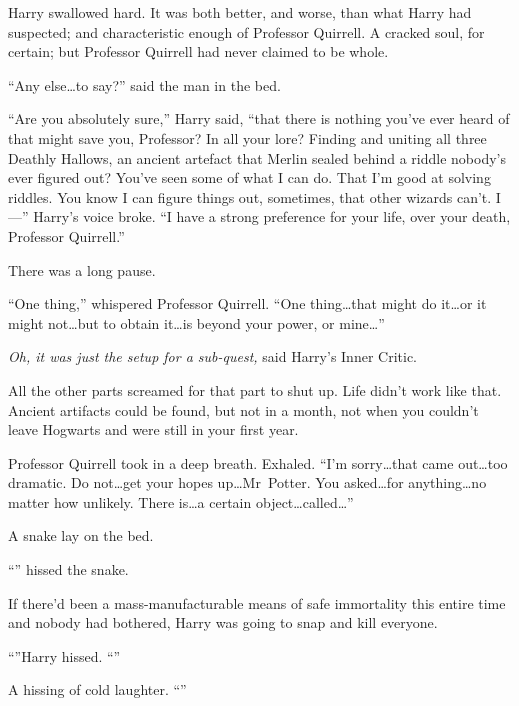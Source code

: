 Harry swallowed hard. It was both better, and worse, than what Harry had suspected; and characteristic enough of Professor Quirrell. A cracked soul, for certain; but Professor Quirrell had never claimed to be whole.

“Any else…to say?” said the man in the bed.

“Are you absolutely sure,” Harry said, “that there is nothing you’ve ever heard of that might save you, Professor? In all your lore? Finding and uniting all three Deathly Hallows, an ancient artefact that Merlin sealed behind a riddle nobody’s ever figured out? You’ve seen some of what I can do. That I’m good at solving riddles. You know I can figure things out, sometimes, that other wizards can’t. I—” Harry’s voice broke. “I have a strong preference for your life, over your death, Professor Quirrell.”

There was a long pause.

“One thing,” whispered Professor Quirrell. “One thing…that might do it…or it might not…but to obtain it…is beyond your power, or mine…”

\emph{Oh, it was just the setup for a sub-quest,} said Harry’s Inner Critic.

All the other parts screamed for that part to shut up. Life didn’t work like that. Ancient artifacts could be found, but not in a month, not when you couldn’t leave Hogwarts and were still in your first year.

Professor Quirrell took in a deep breath. Exhaled. “I’m sorry…that came out…too dramatic. Do not…get your hopes up…Mr~Potter. You asked…for anything…no matter how unlikely. There is…a certain object…called…”

A snake lay on the bed.

“” hissed the snake.

If there’d been a mass-manufacturable means of safe immortality this entire time and nobody had bothered, Harry was going to snap and kill everyone.

“”Harry hissed. “”

A hissing of cold laughter. “”

